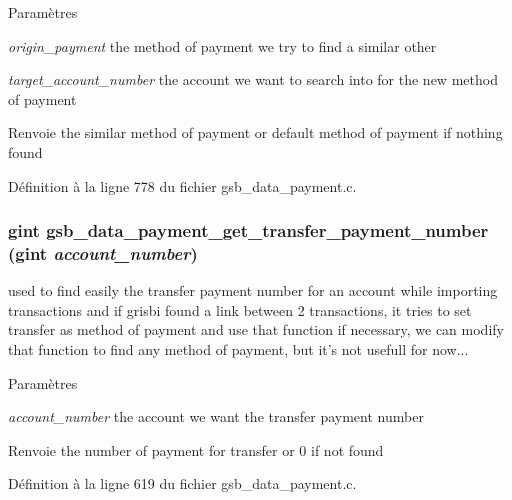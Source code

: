 \begin{DoxyParams}{Paramètres}
\item[{\em origin\_\-payment}]the method of payment we try to find a similar other \item[{\em target\_\-account\_\-number}]the account we want to search into for the new method of payment\end{DoxyParams}
\begin{DoxyReturn}{Renvoie}
the similar method of payment or default method of payment if nothing found 
\end{DoxyReturn}


Définition à la ligne 778 du fichier gsb\_\-data\_\-payment.c.

\subsubsection[{gsb\_\-data\_\-payment\_\-get\_\-transfer\_\-payment\_\-number}]{\setlength{\rightskip}{0pt plus 5cm}gint gsb\_\-data\_\-payment\_\-get\_\-transfer\_\-payment\_\-number (gint {\em account\_\-number})}\label{gsb__data__payment_8c_a11b56161aa3440cc9367c89a72c595d5}
used to find easily the transfer payment number for an account while importing transactions and if grisbi found a link between 2 transactions, it tries to set transfer as method of payment and use that function if necessary, we can modify that function to find any method of payment, but it's not usefull for now...


\begin{DoxyParams}{Paramètres}
\item[{\em account\_\-number}]the account we want the transfer payment number\end{DoxyParams}
\begin{DoxyReturn}{Renvoie}
the number of payment for transfer or 0 if not found 
\end{DoxyReturn}


Définition à la ligne 619 du fichier gsb\_\-data\_\-payment.c.

